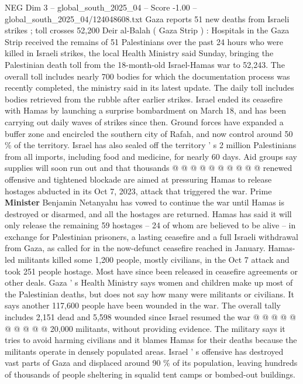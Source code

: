 \begin{textsample}{NEG Dim 3 – global\_south\_2025\_04 – Score -1.00 – global\_south\_2025\_04/124048608.txt}  \label{ex:f3_neg_341}
Gaza reports 51 new deaths from Israeli strikes ; toll crosses 52,200 Deir al-Balah ( Gaza Strip ) : Hospitals in the Gaza Strip received the remains of 51 Palestinians over the past 24 hours who were killed in Israeli strikes, the local Health Ministry said Sunday, bringing the Palestinian death toll from the 18-month-old Israel-Hamas war to 52,243.
The overall toll includes nearly 700 bodies for which the documentation process was recently completed, the ministry said in its latest update.
The daily toll includes bodies retrieved from the rubble after earlier strikes.
Israel ended its ceasefire with Hamas by launching a surprise bombardment on March 18, and has been carrying out daily waves of strikes since then.
Ground forces have expanded a buffer zone and encircled the southern city of Rafah, and now control around 50 \% of the territory.
Israel has also sealed off the territory ' s 2 million Palestinians from all imports, including food and medicine, for nearly 60 days.
Aid groups say supplies will soon run out and that thousands @ @ @ @ @ @ @ @ @ @ renewed offensive and tightened blockade are aimed at pressuring Hamas to release hostages abducted in its Oct 7, 2023, attack that triggered the war.
Prime \textbf{Minister} Benjamin Netanyahu has vowed to continue the war until Hamas is destroyed or disarmed, and all the hostages are returned.
Hamas has said it will only release the remaining 59 hostages -- 24 of whom are believed to be alive -- in exchange for Palestinian prisoners, a lasting ceasefire and a full Israeli withdrawal from Gaza, as called for in the now-defunct ceasefire reached in January.
Hamas-led militants killed some 1,200 people, mostly civilians, in the Oct 7 attack and took 251 people hostage.
Most have since been released in ceasefire agreements or other deals.
Gaza ' s Health Ministry says women and children make up most of the Palestinian deaths, but does not say how many were militants or civilians.
It says another 117,600 people have been wounded in the war.
The overall tally includes 2,151 dead and 5,598 wounded since Israel resumed the war @ @ @ @ @ @ @ @ @ @ 20,000 militants, without providing evidence.
The military says it tries to avoid harming civilians and it blames Hamas for their deaths because the militants operate in densely populated areas.
Israel ' s offensive has destroyed vast parts of Gaza and displaced around 90 \% of its population, leaving hundreds of thousands of people sheltering in squalid tent camps or bombed-out buildings.

\end{textsample}

